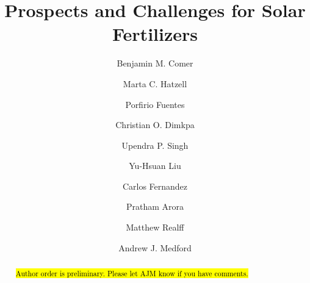 \documentclass[final,1p,times,twocolumn]{elsarticle}
\begin{document}
\begin{frontmatter}


\title{Prospects and Challenges for Solar Fertilizers}




\author[GTChBE]{Benjamin M. Comer}
\author[GTME]{Marta C. Hatzell}
\author[IFDC]{Porfirio Fuentes}
\author[IFDC]{Christian O. Dimkpa}
\author[IFDC]{Upendra P. Singh}
\author[GTEE]{Yu-Hsuan Liu}
\author[GTME]{Carlos Fernandez}
\author[GTChBE]{Pratham Arora}
\author[GTChBE]{Matthew Realff}
\author[GTChBE]{Andrew J. Medford}

\address[GTChBE]{School of Chemical \& Biomolecular Engineering, Georgia Institute of Technology, Atlanta, GA 30318}

\address[GTME]{School of Mechanical Engineering, Georgia Institute of Technology, Atlanta, GA 30318}

\address[GTEE]{School of Environmental Engineering, Georgia Institute of Technology, Atlanta, GA 30318}


\address[IFDC]{International Fertilizer Development Center, Muscle Shoals, AL 35661}


\begin{abstract}
\hl{Author order is preliminary. Please let AJM know if you have comments.}


\end{abstract}
\end{frontmatter}
\end{document}
